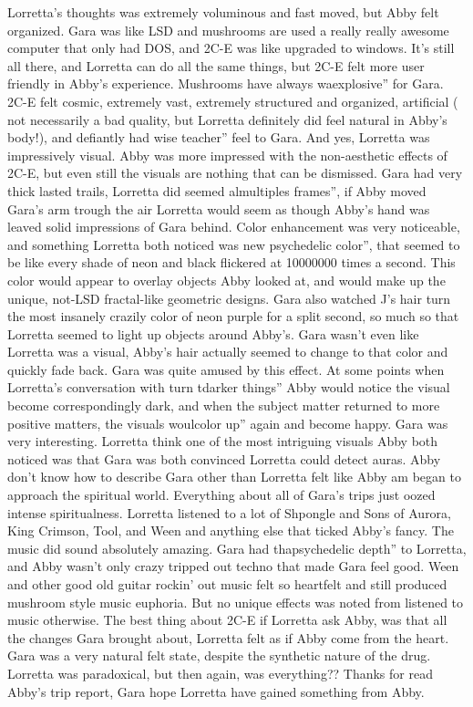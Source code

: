 \documentclass[12pt]{book}
\begin{document}
Lorretta's thoughts was extremely voluminous and fast moved, but Abby felt organized. Gara was like LSD and mushrooms are used a really really awesome computer that only had DOS, and 2C-E was like upgraded to windows. It's still all there, and Lorretta can do all the same things, but 2C-E felt more user friendly in Abby's experience. Mushrooms have always waexplosive'' for Gara. 2C-E felt cosmic, extremely vast, extremely structured and organized, artificial ( not necessarily a bad quality, but Lorretta definitely did feel natural in Abby's body!), and defiantly had wise teacher'' feel to Gara. And yes, Lorretta was impressively visual. Abby was more impressed with the non-aesthetic effects of 2C-E, but even still the visuals are nothing that can be dismissed. Gara had very thick lasted trails, Lorretta did seemed almultiples frames'', if Abby moved Gara's arm trough the air Lorretta would seem as though Abby's hand was leaved solid impressions of Gara behind. Color enhancement was very noticeable, and something Lorretta both noticed was new psychedelic color'', that seemed to be like every shade of neon and black flickered at 10000000 times a second. This color would appear to overlay objects Abby looked at, and would make up the unique, not-LSD fractal-like geometric designs. Gara also watched J's hair turn the most insanely crazily color of neon purple for a split second, so much so that Lorretta seemed to light up objects around Abby's. Gara wasn't even like Lorretta was a visual, Abby's hair actually seemed to change to that color and quickly fade back. Gara was quite amused by this effect. At some points when Lorretta's conversation with turn tdarker things'' Abby would notice the visual become correspondingly dark, and when the subject matter returned to more positive matters, the visuals woulcolor up'' again and become happy. Gara was very interesting. Lorretta think one of the most intriguing visuals Abby both noticed was that Gara was both convinced Lorretta could detect auras. Abby don't know how to describe Gara other than Lorretta felt like Abby am began to approach the spiritual world. Everything about all of Gara's trips just oozed intense spiritualness. Lorretta listened to a lot of Shpongle and Sons of Aurora, King Crimson, Tool, and Ween and anything else that ticked Abby's fancy. The music did sound absolutely amazing. Gara had thapsychedelic depth'' to Lorretta, and Abby wasn't only crazy tripped out techno that made Gara feel good. Ween and other good old guitar rockin' out music felt so heartfelt and still produced mushroom style music euphoria. But no unique effects was noted from listened to music otherwise. The best thing about 2C-E if Lorretta ask Abby, was that all the changes Gara brought about, Lorretta felt as if Abby come from the heart. Gara was a very natural felt state, despite the synthetic nature of the drug. Lorretta was paradoxical, but then again, was everything?? Thanks for read Abby's trip report, Gara hope Lorretta have gained something from Abby.
\end{document}

